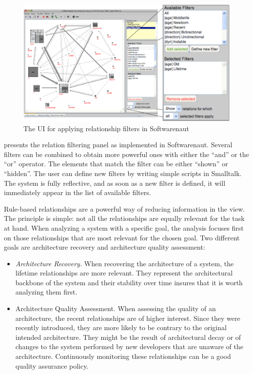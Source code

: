 \documentclass[preprint,12pt]{elsarticle}
\begin{document}
\begin{figure}[ht]
\begin{center}
\includegraphics[width=0.9\linewidth]{SnautFilteringPanel}
\caption{The UI for applying relationship filters in Softwarenaut}
\end{center}
\end{figure}

 presents the relation filtering panel as implemented in Softwarenaut. Several filters can be combined to obtain more powerful ones with either the ``and'' or the ``or'' operator. The elements that match the filter can be either ``shown'' or ``hidden''. The user can define new filters by writing simple scripts in Smalltalk. The system is fully reflective, and as soon as a new filter is defined, it will immediately appear in the list of available filters.

Rule-based relationships are a powerful way of reducing information in the view. The principle is simple: not all the relationships are equally relevant for the task at hand. When analyzing a system with a specific goal, the analysis focuses first on those relationships that are most relevant for the chosen goal. Two different goals are architecture recovery and architecture quality assessment: 

\begin{itemize}

\item {\em Architecture Recovery.} When recovering the architecture of a system, the lifetime relationships are more relevant. They represent the architectural backbone of the system and their stability over time insures that it is worth analyzing them first.

\item {Architecture Quality Assessment.} When assessing the quality of an architecture, the recent relationships are of higher interest. Since they were recently introduced, they are more likely to be contrary to the original intended architecture. They might be the result of architectural decay or of changes to the system performed by new developers that are unaware of the architecture. Continuously monitoring these relationships can be a good quality assurance policy.
\end{itemize}
\end{document}
